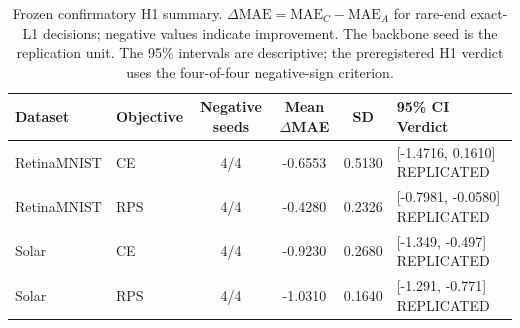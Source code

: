 \begin{table}[t]
\centering
\caption{Frozen confirmatory H1 summary. $\Delta\mathrm{MAE}=\mathrm{MAE}_{C}-\mathrm{MAE}_{A}$ for rare-end exact-L1 decisions; negative values indicate improvement. The backbone seed is the replication unit. The 95\% intervals are descriptive; the preregistered H1 verdict uses the four-of-four negative-sign criterion.}
\label{tab:confirmatory-h1}
\footnotesize
\begin{tabular}{llcccl}
\toprule
Dataset & Objective & Negative seeds & Mean $\Delta$MAE & SD & 95\% CI \quad Verdict \\
\midrule
RetinaMNIST & CE  & 4/4 & -0.6553 & 0.5130 & [-1.4716, 0.1610] \quad REPLICATED \\
RetinaMNIST & RPS & 4/4 & -0.4280 & 0.2326 & [-0.7981, -0.0580] \quad REPLICATED \\
Solar & CE       & 4/4 & -0.9230 & 0.2680 & [-1.349, -0.497] \quad REPLICATED \\
Solar & RPS      & 4/4 & -1.0310 & 0.1640 & [-1.291, -0.771] \quad REPLICATED \\
\bottomrule
\end{tabular}
\end{table}
